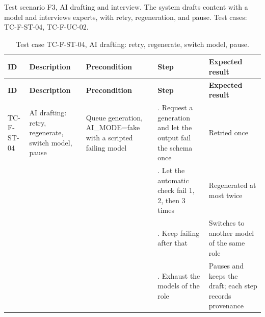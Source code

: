 Test scenario F3, AI drafting and interview. The system drafts content with a model and interviews experts, with retry, regeneration, and pause. Test cases: TC-F-ST-04, TC-F-UC-02.

{\small
\begin{longtable}{|>{\raggedright\arraybackslash}p{}|>{\raggedright\arraybackslash}p{}|>{\raggedright\arraybackslash}p{}|>{\raggedright\arraybackslash}p{}|>{\raggedright\arraybackslash}p{}|}
\caption{Test case TC-F-ST-04, AI drafting: retry, regenerate, switch model, pause.} \\
\hline
\textbf{ID} & \textbf{Description} & \textbf{Precondition} & \textbf{Step} & \textbf{Expected result} \\ \hline
\endfirsthead
\hline
\textbf{ID} & \textbf{Description} & \textbf{Precondition} & \textbf{Step} & \textbf{Expected result} \\ \hline
\endhead
TC-F-ST-04 & AI drafting: retry, regenerate, switch model, pause & Queue generation, AI\_MODE=fake with a scripted failing model & 1. Request a generation and let the output fail the schema once & Retried once \\ \hline
 &  &  & 2. Let the automatic check fail 1, 2, then 3 times & Regenerated at most twice \\ \hline
 &  &  & 3. Keep failing after that & Switches to another model of the same role \\ \hline
 &  &  & 4. Exhaust the models of the role & Pauses and keeps the draft; each step records provenance \\ \hline
\end{longtable}
}

